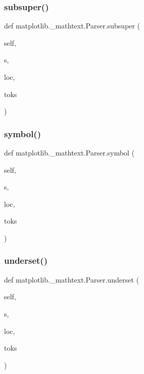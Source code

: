 \subsubsection{\texorpdfstring{subsuper()}{subsuper()}}
{\footnotesize\ttfamily def matplotlib.\+\_\+mathtext.\+Parser.\+subsuper (\begin{DoxyParamCaption}\item[{}]{self,  }\item[{}]{s,  }\item[{}]{loc,  }\item[{}]{toks }\end{DoxyParamCaption})}

\mbox{\label{classmatplotlib_1_1__mathtext_1_1Parser_a8bf398e32270eb62b58dc669fb32449d}} 
\subsubsection{\texorpdfstring{symbol()}{symbol()}}
{\footnotesize\ttfamily def matplotlib.\+\_\+mathtext.\+Parser.\+symbol (\begin{DoxyParamCaption}\item[{}]{self,  }\item[{}]{s,  }\item[{}]{loc,  }\item[{}]{toks }\end{DoxyParamCaption})}

\mbox{\label{classmatplotlib_1_1__mathtext_1_1Parser_a9029033446d4e297aea5b4b7055d60f2}} 
\subsubsection{\texorpdfstring{underset()}{underset()}}
{\footnotesize\ttfamily def matplotlib.\+\_\+mathtext.\+Parser.\+underset (\begin{DoxyParamCaption}\item[{}]{self,  }\item[{}]{s,  }\item[{}]{loc,  }\item[{}]{toks }\end{DoxyParamCaption})}

